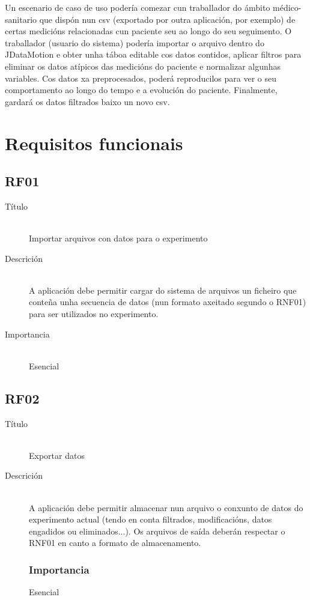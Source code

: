 Un escenario de caso de uso podería comezar cun traballador do ámbito médico-sanitario que dispón nun csv (exportado por outra aplicación, por exemplo) de certas medicións relacionadas cun paciente seu ao longo do seu seguimento. O traballador (usuario do sistema) podería importar o arquivo dentro do JDataMotion e obter unha táboa editable cos datos contidos, aplicar filtros para eliminar os datos atípicos das medicións do paciente e normalizar algunhas variables. Cos datos xa preprocesados, poderá reproducilos para ver o seu comportamento ao longo do tempo e a evolución do paciente. Finalmente, gardará os datos filtrados baixo un novo csv.

\section{Requisitos funcionais}

\subsection*{RF01}
\begin{description}
\item[Título] \hfill \\
Importar arquivos con datos para o experimento
\item[Descrición] \hfill \\
A aplicación debe permitir cargar do sistema de arquivos un ficheiro que conteña unha secuencia de datos (nun formato axeitado segundo o RNF01) para ser utilizados no experimento.
\item[Importancia] \hfill \\
Esencial
\end{description}

\subsection*{RF02}
\begin{description}
\item[Título] \hfill \\
Exportar datos
\item[Descrición] \hfill \\
A aplicación debe permitir almacenar nun arquivo o conxunto de datos do experimento actual (tendo en conta filtrados, modificacións, datos engadidos ou eliminados...). Os arquivos de saída deberán respectar o RNF01 en canto a formato de almacenamento.
\subsubsection{Importancia}
Esencial
\end{description}


